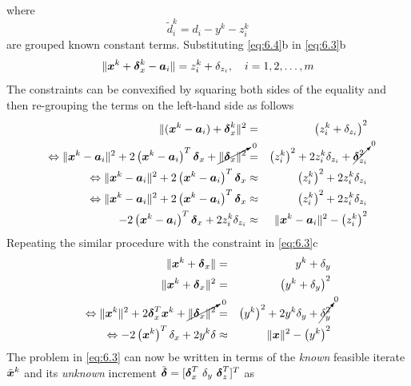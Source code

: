 where 
\begin{equation}
\nonumber
\tilde{d}^k_i =  d_i - y^k - z_i^k
\end{equation}
 are grouped known constant terms.
Substituting \ref{eq:6.4}b in \ref{eq:6.3}b
\begin{equation}
\nonumber
\|\mbox{\boldmath$x$}^k + \mbox{\boldmath${\delta}$}^k_x - \mbox{\boldmath$a$}_i\| = z^k_i +\delta_{z_i}, \quad i = 1, 2, \ldots, m
\end{equation}
The constraints can be convexified by squaring both sides of the equality and then re-grouping the terms on the left-hand side as follows
\begin{eqnarray}
\nonumber
\|(\mbox{\boldmath$x$}^k  - \mbox{\boldmath$a$}_i) + \mbox{\boldmath${\delta}$}^k_x\|^2 & = & \left(z^k_i +\delta_{z_i}\right)^2 \\
\nonumber
\Leftrightarrow 
\|\mbox{\boldmath$x$}^k  - \mbox{\boldmath$a$}_i\|^2 + 2\left( \mbox{\boldmath$x$}^k  - \mbox{\boldmath$a$}_i \right)^T\mbox{\boldmath${\delta}$}_x + \cancelto{\mbox{\scriptsize{0}}}{\|\mbox{\boldmath${\delta}$}_x\|^2}  & = & \left(z_i^k\right)^2 + 2z_i^k\delta_{z_i} + \cancelto{\mbox{\scriptsize{0}}}{\mbox{\boldmath${\delta}$}^2_{z_i}} \\
\nonumber
\Leftrightarrow \|\mbox{\boldmath$x$}^k  - \mbox{\boldmath$a$}_i\|^2 + 2\left( \mbox{\boldmath$x$}^k  - \mbox{\boldmath$a$}_i \right)^T\mbox{\boldmath${\delta}$}_x   & \approx & \left(z_i^k\right)^2 + 2z_i^k\delta_{z_i} \\
\nonumber
\Leftrightarrow \|\mbox{\boldmath$x$}^k  - \mbox{\boldmath$a$}_i\|^2 + 2\left( \mbox{\boldmath$x$}^k  - \mbox{\boldmath$a$}_i \right)^T\mbox{\boldmath${\delta}$}_x   & \approx & \left(z_i^k\right)^2 + 2z_i^k\delta_{z_i} \\
\nonumber
- 2\left( \mbox{\boldmath$x$}^k  - \mbox{\boldmath$a$}_i \right)^T\mbox{\boldmath${\delta}$}_x + 2z_i^k\delta_{z_i}  & \approx & \|\mbox{\boldmath$x$}^k  - \mbox{\boldmath$a$}_i\|^2 - \left(z_i^k\right)^2
\end{eqnarray}
Repeating the similar procedure with the constraint in \ref{eq:6.3}c
\begin{eqnarray}
\nonumber
\|\mbox{\boldmath$x$}^k + \mbox{\boldmath${\delta}$}_x\| & = & y^k + \delta_y \\
\nonumber
\|\mbox{\boldmath$x$}^k + \mbox{\boldmath${\delta}$}_x\|^2 & = & \left(y^k + \delta_y \right)^2 \\
\nonumber
\Leftrightarrow \|\mbox{\boldmath$x$}^k\|^2 + 2\mbox{\boldmath${\delta}$}_x^T\mbox{\boldmath$x$}^k + \cancelto{\mbox{\scriptsize{0}}}{\|\mbox{\boldmath${\delta}$}_x\|^2} & = & \left(y^k\right)^2 + 2y^k\delta_y +  \cancelto{\mbox{\scriptsize{0}}}{\delta_y^2} \\
\nonumber
\Leftrightarrow -2\left(\mbox{\boldmath$x$}^k\right)^T\delta_x + 2y^k\delta & \approx & \|\mbox{\boldmath$x$}\|^2 - \left(y^k\right)^2
\end{eqnarray}
The problem in \ref{eq:6.3} can now be written in terms of the \textit{known} feasible  iterate $\tilde{\mbox{\boldmath$x$}}^k$ and its \textit{unknown} increment  $\tilde{\mbox{\boldmath${\delta}$}} = [\mbox{\boldmath${\delta}$}_x^T \  \delta_y \ \mbox{\boldmath${\delta}$}_{z}^T]^T$ as
\setcounter{abc}{0}
